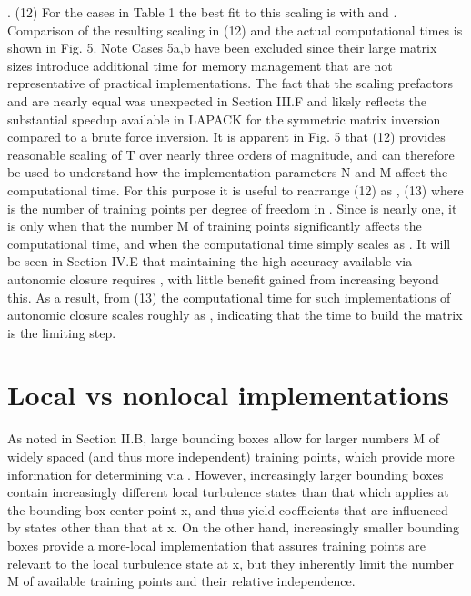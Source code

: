 .                                                (12)
For the cases in Table 1 the best fit to this scaling is with   and  . Comparison of the resulting scaling in (12) and the actual computational times is shown in Fig. 5. Note Cases 5a,b have been excluded since their large matrix sizes introduce additional time for memory management that are not representative of practical implementations. The fact that the scaling prefactors   and   are nearly equal was unexpected in Section III.F and likely reflects the substantial speedup available in LAPACK for the symmetric matrix inversion compared to a brute force inversion.
It is apparent in Fig. 5 that (12) provides reasonable scaling of T over nearly three orders of magnitude, and can therefore be used to understand how the implementation parameters N and M affect the computational time. For this purpose it is useful to rearrange (12) as
    ,                                              (13)
where   is the number of training points per degree of freedom in  . Since   is nearly one, it is only when   that the number M of training points significantly affects the computational time, and when   the computational time simply scales as  . It will be seen in Section IV.E that maintaining the high accuracy available via autonomic closure requires  , with little benefit gained from increasing   beyond this. As a result, from (13) the computational time for such implementations of autonomic closure scales roughly as  , indicating that the time to build the   matrix is the limiting step.  

\section{Local vs nonlocal implementations} 

As noted in Section II.B, large bounding boxes allow for larger numbers M of widely spaced (and thus more independent) training points, which provide more information for determining   via  . However, increasingly larger bounding boxes contain increasingly different local turbulence states than that which applies at the bounding box center point x, and thus yield coefficients   that are influenced by states other than that at x. On the other hand, increasingly smaller bounding boxes provide a more-local implementation that assures training points are relevant to the local turbulence state at x, but they inherently limit the number M of available training points and their relative independence.  


